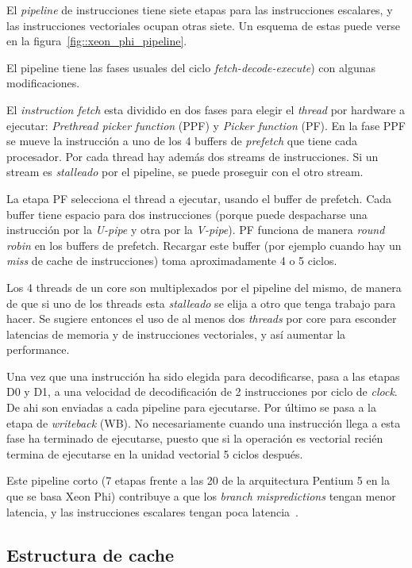 El \textit{pipeline} de instrucciones tiene siete etapas  para las instrucciones escalares, y las
instrucciones vectoriales ocupan otras siete. Un esquema de estas puede verse en la figura~\ref{fig::xeon_phi_pipeline}.

El pipeline tiene las fases usuales del ciclo \textit{fetch-decode-execute}) con algunas modificaciones.

El \textit{instruction fetch} esta dividido en dos fases para elegir el \textit{thread} por hardware a ejecutar:
\textit{Prethread picker function} (PPF) y \textit{Picker function} (PF). En la fase PPF se mueve la instrucci\'on
a uno de los 4 buffers de \textit{prefetch} que tiene cada procesador. Por cada thread hay adem\'as dos streams de
instrucciones. Si un stream es \textit{stalleado} por el pipeline, se puede proseguir con el otro stream.

La etapa PF selecciona el thread a ejecutar, usando el buffer de prefetch. Cada buffer tiene espacio para dos
instrucciones (porque puede despacharse una instrucci\'on por la \textit{U-pipe} y otra por la \textit{V-pipe}). PF
funciona de manera \textit{round robin} en los buffers de prefetch. Recargar este buffer (por ejemplo cuando hay un
\textit{miss} de cache de instrucciones) toma aproximadamente 4 o 5 ciclos.

Los 4 threads de un core son multiplexados por el pipeline del mismo, de manera de que si uno de los threads esta
\textit{stalleado} se elija a otro que tenga trabajo para hacer. Se sugiere entonces el uso de al menos dos
\textit{threads} por core para esconder latencias de memoria y de instrucciones vectoriales, y as\'i aumentar la performance.

Una vez que una instrucci\'on ha sido elegida para decodificarse, pasa a las etapas D0 y D1, a una velocidad de
decodificaci\'on de 2 instrucciones por ciclo de \textit{clock}. De ahi son enviadas a cada pipeline para ejecutarse.
Por \'ultimo se pasa a la etapa de \textit{writeback} (WB). No necesariamente cuando una instrucci\'on llega a esta
fase ha terminado de ejecutarse, puesto que si la operaci\'on es vectorial reci\'en termina de ejecutarse en la unidad
vectorial 5 ciclos despu\'es.

Este pipeline corto (7 etapas frente a las 20 de la arquitectura Pentium 5 en la que se basa Xeon Phi) contribuye a que
los \textit{branch mispredictions} tengan menor latencia, y las instrucciones escalares tengan poca latencia~\cite{IntelXeonPhiWhitePaper}.

\subsection{Estructura de cache}


